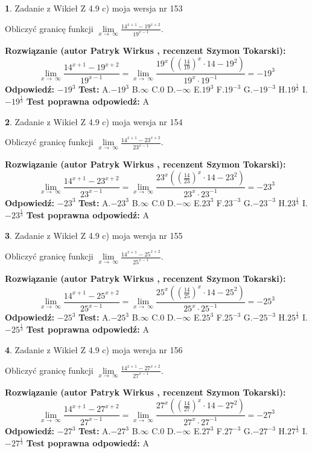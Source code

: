\documentclass[12pt, a4paper]{article}
\theoremstyle{definition} %
\newtheorem{zad}{}
\newcommand{\zadStart}[1]{\begin{zad}#1\newline}
\newcommand{\zadStop}{\end{zad}}
\newcommand{\rozwStart}[2]{\noindent \textbf{Rozwiązanie (autor #1 , recenzent #2): }\newline}
\newcommand{\rozwStop}{\newline}
\newcommand{\odpStart}{\noindent \textbf{Odpowiedź:}\newline}
\newcommand{\odpStop}{\newline}
\newcommand{\testStart}{\noindent \textbf{Test:}\newline}
\newcommand{\testStop}{\newline}
\newcommand{\kluczStart}{\noindent \textbf{Test poprawna odpowiedź:}\newline}
\newcommand{\kluczStop}{\newline}
\begin{document}
\zadStart{Zadanie z Wikieł Z 4.9 c) moja wersja nr 153}


Obliczyć granicę funkcji  $\lim\limits_{x\to\ \infty}\frac{14^{x+1}-19^{x+2}}{19^{x-1}}$.
\zadStop
\rozwStart{Patryk Wirkus}{Szymon Tokarski}
$$\lim\limits_{x\to\ \infty}\frac{14^{x+1}-19^{x+2}}{19^{x-1}}=\lim\limits_{x\to\ \infty}\frac{19^{x}((\frac{14}{19})^{x}\cdot 14 -19^{2})}{19^{x}\cdot 19^{-1}} = -19^{3}$$
\rozwStop
\odpStart
$-19^{3}$
\odpStop
\testStart
A.$-19^{3}$ B.$\infty$ C.$0$ D.$-\infty$ E.$19^{3}$
F.$19^{-3}$ G.$-19^{-3}$
H.$19^{\frac{1}{3}}$
I.$-19^{\frac{1}{3}}$
\testStop
\kluczStart
A
\kluczStop



\zadStart{Zadanie z Wikieł Z 4.9 c) moja wersja nr 154}


Obliczyć granicę funkcji  $\lim\limits_{x\to\ \infty}\frac{14^{x+1}-23^{x+2}}{23^{x-1}}$.
\zadStop
\rozwStart{Patryk Wirkus}{Szymon Tokarski}
$$\lim\limits_{x\to\ \infty}\frac{14^{x+1}-23^{x+2}}{23^{x-1}}=\lim\limits_{x\to\ \infty}\frac{23^{x}((\frac{14}{23})^{x}\cdot 14 -23^{2})}{23^{x}\cdot 23^{-1}} = -23^{3}$$
\rozwStop
\odpStart
$-23^{3}$
\odpStop
\testStart
A.$-23^{3}$ B.$\infty$ C.$0$ D.$-\infty$ E.$23^{3}$
F.$23^{-3}$ G.$-23^{-3}$
H.$23^{\frac{1}{3}}$
I.$-23^{\frac{1}{3}}$
\testStop
\kluczStart
A
\kluczStop



\zadStart{Zadanie z Wikieł Z 4.9 c) moja wersja nr 155}


Obliczyć granicę funkcji  $\lim\limits_{x\to\ \infty}\frac{14^{x+1}-25^{x+2}}{25^{x-1}}$.
\zadStop
\rozwStart{Patryk Wirkus}{Szymon Tokarski}
$$\lim\limits_{x\to\ \infty}\frac{14^{x+1}-25^{x+2}}{25^{x-1}}=\lim\limits_{x\to\ \infty}\frac{25^{x}((\frac{14}{25})^{x}\cdot 14 -25^{2})}{25^{x}\cdot 25^{-1}} = -25^{3}$$
\rozwStop
\odpStart
$-25^{3}$
\odpStop
\testStart
A.$-25^{3}$ B.$\infty$ C.$0$ D.$-\infty$ E.$25^{3}$
F.$25^{-3}$ G.$-25^{-3}$
H.$25^{\frac{1}{3}}$
I.$-25^{\frac{1}{3}}$
\testStop
\kluczStart
A
\kluczStop



\zadStart{Zadanie z Wikieł Z 4.9 c) moja wersja nr 156}


Obliczyć granicę funkcji  $\lim\limits_{x\to\ \infty}\frac{14^{x+1}-27^{x+2}}{27^{x-1}}$.
\zadStop
\rozwStart{Patryk Wirkus}{Szymon Tokarski}
$$\lim\limits_{x\to\ \infty}\frac{14^{x+1}-27^{x+2}}{27^{x-1}}=\lim\limits_{x\to\ \infty}\frac{27^{x}((\frac{14}{27})^{x}\cdot 14 -27^{2})}{27^{x}\cdot 27^{-1}} = -27^{3}$$
\rozwStop
\odpStart
$-27^{3}$
\odpStop
\testStart
A.$-27^{3}$ B.$\infty$ C.$0$ D.$-\infty$ E.$27^{3}$
F.$27^{-3}$ G.$-27^{-3}$
H.$27^{\frac{1}{3}}$
I.$-27^{\frac{1}{3}}$
\testStop
\kluczStart
A
\kluczStop
\end{document}
